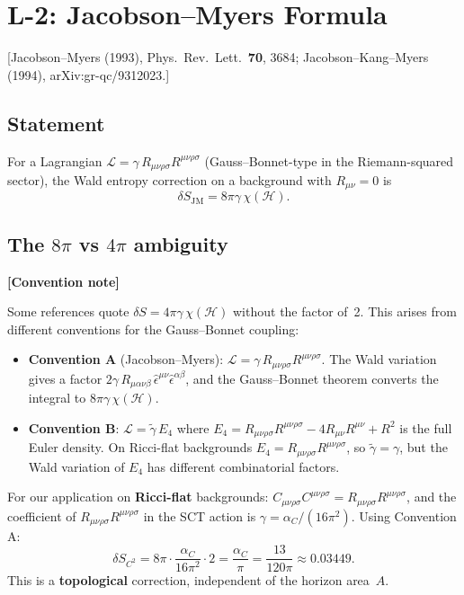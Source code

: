 \documentclass[12pt,a4paper]{article}
\theoremstyle{definition}
\theoremstyle{remark}
\newcommand{\Rsq}{R_{\mu\nu\rho\sigma}R^{\mu\nu\rho\sigma}}
\newcommand{\Ricsq}{R_{\mu\nu}R^{\mu\nu}}
\newcommand{\Weylsq}{C_{\mu\nu\rho\sigma}C^{\mu\nu\rho\sigma}}
\newcommand{\fromlit}[1]{\textcolor{blue!70!black}{\textsf{[#1]}}}
\newcommand{\signcorrection}[1]{%
  \par\noindent\colorbox{red!10}{%
    \parbox{\dimexpr\linewidth-2\fboxsep}{%
      \textcolor{red!50!black}{\textbf{[Convention note]}}
      \textcolor{red!50!black}{#1}%
    }%
  }\par%
}
\begin{document}
\section{L-2: Jacobson--Myers Formula}
\label{sec:L2}

\fromlit{Jacobson--Myers (1993), Phys.\ Rev.\ Lett.~\textbf{70}, 3684;
Jacobson--Kang--Myers (1994), arXiv:gr-qc/9312023.}

\subsection{Statement}

For a Lagrangian $\mathcal{L} = \gamma\,\Rsq$ (Gauss--Bonnet-type
in the Riemann-squared sector), the Wald entropy correction on
a background with $R_{\mu\nu} = 0$ is
\begin{equation}\label{eq:JM-formula}
  \boxed{
  \delta S_{\mathrm{JM}} = 8\pi\gamma\,\chi(\mathcal{H}).}
\end{equation}

\subsection{The $8\pi$ vs $4\pi$ ambiguity}

\signcorrection{Some references quote $\delta S = 4\pi\gamma\,
\chi(\mathcal{H})$ without the factor of~2.  This arises from
different conventions for the Gauss--Bonnet coupling:
\begin{itemize}[nosep]
\item \textbf{Convention A} (Jacobson--Myers): $\mathcal{L} =
  \gamma\,\Rsq$.  The Wald variation gives a factor
  $2\gamma\,R_{\mu\alpha\nu\beta}\,\hat{\epsilon}^{\mu\nu}
  \hat{\epsilon}^{\alpha\beta}$, and the Gauss--Bonnet theorem
  converts the integral to $8\pi\gamma\,\chi(\mathcal{H})$.
\item \textbf{Convention B}: $\mathcal{L} = \tilde{\gamma}\,E_4$
  where $E_4 = \Rsq - 4\Ricsq + R^2$ is the full Euler density.
  On Ricci-flat backgrounds $E_4 = \Rsq$, so $\tilde{\gamma} =
  \gamma$, but the Wald variation of $E_4$ has different
  combinatorial factors.
\end{itemize}
For our application on \textbf{Ricci-flat} backgrounds:
$\Weylsq = \Rsq$, and the coefficient of $\Rsq$ in the SCT
action is $\gamma = \alpha_C/(16\pi^2)$.  Using Convention A:
\begin{equation}\label{eq:delta-S-C2}
  \delta S_{C^2} = 8\pi \cdot \frac{\alpha_C}{16\pi^2} \cdot 2
  = \frac{\alpha_C}{\pi}
  = \frac{13}{120\pi}
  \approx 0.03449.
\end{equation}
This is a \textbf{topological} correction, independent of the
horizon area~$A$.}
\end{document}
